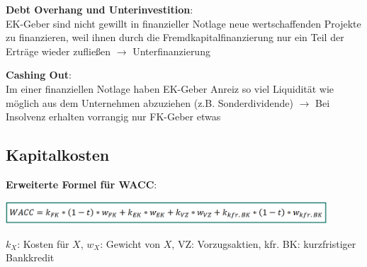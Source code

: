 \textbf{Debt Overhang und Unterinvestition}:\\
EK-Geber sind nicht gewillt in finanzieller Notlage neue wertschaffenden Projekte zu finanzieren, weil ihnen durch die Fremdkapitalfinanzierung nur ein Teil der Erträge wieder zufließen $\rightarrow$ Unterfinanzierung

\textbf{Cashing Out}:\\
Im einer finanziellen Notlage haben EK-Geber Anreiz so viel Liquidität wie möglich aus dem Unternehmen abzuziehen (z.B. Sonderdividende) $\rightarrow$ Bei Insolvenz erhalten vorrangig nur FK-Geber etwas

\subsection{Kapitalkosten}
\textbf{Erweiterte Formel für WACC}:
\begin{center}
	\includegraphics[width=0.9\textwidth]{images/e8.png}
\end{center}
$k_X$: Kosten für $X$, $w_X$: Gewicht von $X$, VZ: Vorzugsaktien, kfr. BK: kurzfristiger Bankkredit